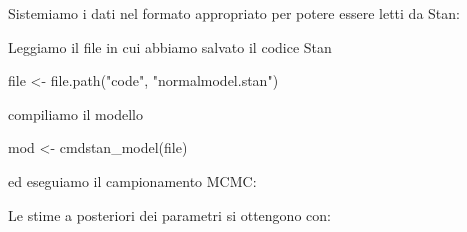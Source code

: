 \documentclass[
  11pt,
]{krantz}
\makeatletter
\newenvironment{Shaded}{\begin{snugshade}}{\end{snugshade}}
\newcommand{\AttributeTok}[1]{\textcolor[rgb]{0.61,0.61,0.61}{#1}}
\newcommand{\DecValTok}[1]{\textcolor[rgb]{0.06,0.06,0.06}{#1}}
\newcommand{\FunctionTok}[1]{\textcolor[rgb]{0,0,0}{#1}}
\newcommand{\NormalTok}[1]{#1}
\newcommand{\OtherTok}[1]{\textcolor[rgb]{0.37,0.37,0.37}{#1}}
\newcommand{\SpecialCharTok}[1]{\textcolor[rgb]{0,0,0}{#1}}
\newcommand{\StringTok}[1]{\textcolor[rgb]{0.5,0.5,0.5}{#1}}
\newenvironment{kframe}{%
\medskip{}
\setlength{\fboxsep}{.8em}
 \def\at@end@of@kframe{}%
 \ifinner\ifhmode%
  \def\at@end@of@kframe{\end{minipage}}%
  \begin{minipage}{\columnwidth}%
 \fi\fi%
 \def\FrameCommand##1{\hskip\@totalleftmargin \hskip-\fboxsep
 \colorbox{shadecolor}{##1}\hskip-\fboxsep
     \hskip-\linewidth \hskip-\@totalleftmargin \hskip\columnwidth}%
 \MakeFramed {\advance\hsize-\width
   \@totalleftmargin\z@ \linewidth\hsize
   \@setminipage}}%
 {\par\unskip\endMakeFramed%
 \at@end@of@kframe}
\renewenvironment{Shaded}{\begin{kframe}}{\end{kframe}}
\theoremstyle{definition}
\theoremstyle{definition}
\theoremstyle{definition}
\theoremstyle{definition}
\theoremstyle{remark}
\makeatother
\begin{document}
Sistemiamo i dati nel formato appropriato per potere essere letti da Stan:

\begin{Shaded}
\end{Shaded}

Leggiamo il file in cui abbiamo salvato il codice Stan

\begin{Shaded}
\begin{Highlighting}[]
\NormalTok{file }\OtherTok{\textless{}{-}} \FunctionTok{file.path}\NormalTok{(}\StringTok{"code"}\NormalTok{, }\StringTok{"normalmodel.stan"}\NormalTok{)}
\end{Highlighting}
\end{Shaded}

compiliamo il modello

\begin{Shaded}
\begin{Highlighting}[]
\NormalTok{mod }\OtherTok{\textless{}{-}} \FunctionTok{cmdstan\_model}\NormalTok{(file)}
\end{Highlighting}
\end{Shaded}

ed eseguiamo il campionamento MCMC:

\begin{Shaded}
\end{Shaded}

Le stime a posteriori dei parametri si ottengono con:
\end{document}
